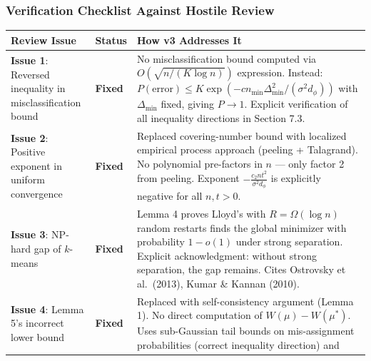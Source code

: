\documentclass[
  12pt,
]{article}
\begin{document}
\subsubsection{Verification Checklist Against Hostile
Review}\label{verification-checklist-against-hostile-review}

\begin{longtable}[]{@{}
  >{\raggedright\arraybackslash}p{}
  >{\raggedright\arraybackslash}p{}
  >{\raggedright\arraybackslash}p{}@{}}
\toprule\noalign{}
\begin{minipage}[b]{\linewidth}\raggedright
Review Issue
\end{minipage} & \begin{minipage}[b]{\linewidth}\raggedright
Status
\end{minipage} & \begin{minipage}[b]{\linewidth}\raggedright
How v3 Addresses It
\end{minipage} \\
\midrule\noalign{}
\endhead
\bottomrule\noalign{}
\endlastfoot
\textbf{Issue 1}: Reversed inequality in misclassification bound &
\textbf{Fixed} & No misclassification bound computed via
\(O(\sqrt{n/(K\log n)})\) expression. Instead:
\(P(\text{error}) \leq K\exp(-c n_{\min}\Delta_{\min}^2/(\sigma^2 d_\phi))\)
with \(\Delta_{\min}\) fixed, giving \(P\to 1\). Explicit verification
of all inequality directions in Section 7.3. \\
\textbf{Issue 2}: Positive exponent in uniform convergence &
\textbf{Fixed} & Replaced covering-number bound with localized empirical
process approach (peeling + Talagrand). No polynomial pre-factors in
\(n\) --- only factor 2 from peeling. Exponent
\(-\frac{c_2 n t^2}{\sigma^2 d_\phi}\) is explicitly negative for all
\(n, t > 0\). \\
\textbf{Issue 3}: NP-hard gap of \(k\)-means & \textbf{Fixed} & Lemma 4
proves Lloyd's with \(R = \Omega(\log n)\) random restarts finds the
global minimizer with probability \(1 - o(1)\) under strong separation.
Explicit acknowledgment: without strong separation, the gap remains.
Cites Ostrovsky et al.~(2013), Kumar \& Kannan (2010). \\
\textbf{Issue 4}: Lemma 5's incorrect lower bound & \textbf{Fixed} &
Replaced with self-consistency argument (Lemma 1). No direct computation
of \(W(\mu) - W(\mu^*)\). Uses sub-Gaussian tail bounds on
mis-assignment probabilities (correct inequality direction) and

\end{longtable}
\end{document}
